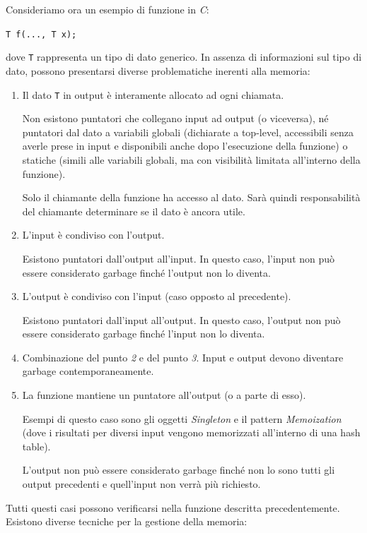\documentclass{article}
\begin{document}
Consideriamo ora un esempio di funzione in \textit{C}:
\begin{center}
    \texttt{T f(..., T x);}
\end{center}
dove \texttt{T} rappresenta un tipo di dato generico. In assenza di informazioni sul tipo di dato, possono presentarsi diverse problematiche inerenti alla memoria:
\begin{enumerate}
    \item Il dato \texttt{T} in output è interamente allocato ad ogni chiamata. 
    
    Non esistono puntatori che collegano input ad output (o viceversa), né puntatori dal dato a variabili globali (dichiarate a top-level, accessibili senza averle prese in input e disponibili anche dopo l'esecuzione della funzione) o statiche (simili alle variabili globali, ma con visibilità limitata all'interno della funzione).
    
    Solo il chiamante della funzione ha accesso al dato. Sarà quindi responsabilità del chiamante determinare se il dato è ancora utile.
    \item L'input è condiviso con l'output.
    
    Esistono puntatori dall'output all'input. In questo caso, l'input non può essere considerato garbage finché l'output non lo diventa.
    \item L'output è condiviso con l'input (caso opposto al precedente).
    
    Esistono puntatori dall'input all'output. In questo caso, l'output non può essere considerato garbage finché l'input non lo diventa.
    \item Combinazione del punto \textit{2} e del punto \textit{3}. Input e output devono diventare garbage contemporaneamente.
    \item La funzione mantiene un puntatore all'output (o a parte di esso). 
    
    Esempi di questo caso sono gli oggetti \textit{Singleton} e il pattern \textit{Memoization} (dove i risultati per diversi input vengono memorizzati all'interno di una hash table).

    L'output non può essere considerato garbage finché non lo sono tutti gli output precedenti e quell'input non verrà più richiesto.
\end{enumerate}
Tutti questi casi possono verificarsi nella funzione descritta precedentemente.\vspace{14pt}\\
Esistono diverse tecniche per la gestione della memoria:
\end{document}
